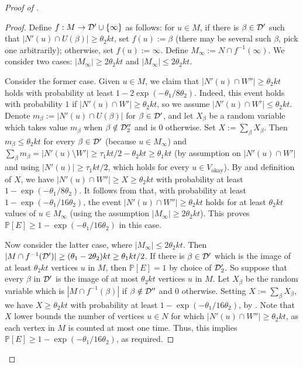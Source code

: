 \documentclass[english]{article}
\theoremstyle{plain}
\theoremstyle{remark}
\def \Vo {V_{\okay}}
\renewcommand{\Pr}{\mathbb{P}}
\DeclareMathOperator{\okay}{okay}
\begin{document}
\begin{proof}[Proof of ]
\begin{proof}
				\def \Mi {M_{\infty}}
				Define $f : M \to \mathcal{D}' \cup \{\infty\}$ as follows: for $u \in M$, if there is $\beta \in \mathcal{D}'$ such that $|N'(u) \cap U(\beta)| \ge \theta_2 kt$, set $f(u) := \beta$ (there may be several such $\beta$, pick one arbitrarily); otherwise, set $f(u) := \infty$. Define $\Mi := N \cap f^{-1}(\infty)$. We consider two cases: $|\Mi| \ge 2\theta_2 kt$ and $|\Mi| \le 2\theta_2 kt$.

				Consider the former case.
				Given $u \in M$, we claim that $|N'(u) \cap W''| \ge \theta_2 kt$ holds with probability at least $1 - 2\exp(-\theta_1/8\theta_2)$.
				Indeed, this event holds with probability $1$ if $|N'(u) \cap W'| \ge \theta_2 kt$, so we assume $|N'(u) \cap W'| \le \theta_2 kt$. Denote $m_{\beta} := |N'(u) \cap U(\beta)|$ for $\beta \in \mathcal{D}'$, and let $X_{\beta}$ be a random variable which takes value $m_{\beta}$ when $\beta \notin \mathcal{D}_2''$ and is $0$ otherwise. Set $X := \sum_{\beta} X_{\beta}$. 
				Then $m_{\beta} \le \theta_2 kt$ for every $\beta \in \mathcal{D}'$ (because $u \in \Mi$) and $\sum_{\beta} m_{\beta} = |N'(u) \setminus W'| \ge \tau_1 kt / 2 - \theta_2 kt \ge \theta_1 kt$ (by assumption on $|N'(u) \cap W'|$ and using $|N'(u)| \ge \tau_1 kt/2$, which holds for every $u \in \Vo$). By  and definition of $X$, we have $|N'(u) \cap W''| \ge X \ge \theta_2 kt$ with probability at least $1 - \exp(-\theta_1/8\theta_2)$. It follows from  that, with probability at least $1 - \exp(-\theta_1/16\theta_2)$, the event $|N'(u) \cap W''| \ge \theta_2 kt$ holds for at least $\theta_2 kt$ values of $u \in \Mi$ (using the assumption $|\Mi| \ge 2\theta_2 kt$). This proves $\Pr[E] \ge 1 - \exp(-\theta_1/16\theta_2)$ in this case.

				Now consider the latter case, where $|\Mi| \le 2\theta_2 kt$.
				Then $|M \cap f^{-1}(\mathcal{D}')| \ge (\theta_1 - 2\theta_2)kt \ge \theta_1 kt / 2$. 
				If there is $\beta \in \mathcal{D}'$ which is the image of at least $\theta_2 kt$ vertices $u$ in $M$, then $\Pr[E] = 1$ by choice of $\mathcal{D}_2'$. 
				So suppose that every $\beta$ in $\mathcal{D}'$ is the image of at most $\theta_2 kt$ vertices $u$ in $M$. 
				Let $X_{\beta}$ be the random variable which is $|M \cap f^{-1}(\beta)|$ if $\beta \notin \mathcal{D}''$ and $0$ otherwise. Setting $X := \sum_{\beta} X_{\beta}$, we have $X \ge \theta_2 kt$ with probability at least $1 - \exp(-\theta_1 / 16 \theta_2)$, by . Note that $X$ lower bounds the number of vertices $u \in N$ for which $|N'(u) \cap W''| \ge \theta_2 kt$, as each vertex in $M$ is counted at most one time. 
				Thus, this implies $\Pr[E] \ge 1 - \exp(-\theta_1 / 16 \theta_2)$, as required.
			\end{proof}
		

\end{proof}
\end{document}
